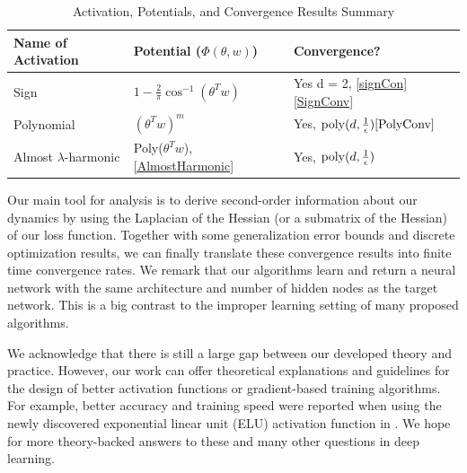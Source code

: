 \documentclass{article}
\begin{document}
\begin{table}[tb]
\caption{Activation, Potentials, and Convergence Results Summary}
\label{table1}
\noindent
\vskip 0.1in
\begin{center}
\begin{small}
\begin{sc}
\begin{tabular}{
  |p{}%
  |p{}%
  |p{}|%
  }
   \hline 
        Name of Activation&  Potential  ($\Phi(\theta,w)$)    & Convergence? \\ \hline 
        Sign & $1 - \frac{2}{\pi}\cos^{-1}(\theta^Tw)$       & Yes d = 2, \ref{signCon} \ref{SignConv}\\ 
        Polynomial  & $(\theta^Tw)^m$       & Yes, $\mathrm{poly}(d,\frac{1}{\epsilon}) \ref{PolyConv}$  \\        
        Almost   $\lambda$-harmonic  & Poly($\theta^Tw$), \ref{AlmostHarmonic}  & Yes, $\mathrm{poly}(d,\frac{1}{\epsilon})$ \\
        \hline
\end{tabular}
\end{sc}
\end{small}
\end{center}
\vskip -0.1in
\end{table} 
%
Our main tool for analysis is to derive second-order information about our dynamics by using the Laplacian of the Hessian (or a submatrix of the Hessian) of our loss function. Together with some generalization error bounds and discrete optimization results, we can finally translate these convergence results into finite time convergence rates. We remark that our algorithms learn and return a neural network with the same architecture and number of hidden nodes as the target network. This is a big contrast to the improper learning setting of many proposed algorithms. 

We acknowledge that there is still a large gap between our developed theory and practice. However, our work can offer theoretical explanations and guidelines for the design of better activation functions or gradient-based training algorithms. For example, better accuracy and training speed were reported when using the newly discovered exponential linear unit (ELU) activation function in \cite{ClevertUH15} \cite{ShahKSS16}. We hope for more theory-backed answers to these and many other questions in deep learning.
\end{document}
